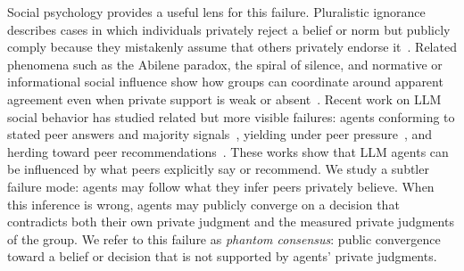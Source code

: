\documentclass{article}
\begin{document}
Social psychology provides a useful lens for this failure. Pluralistic ignorance describes cases in which individuals privately reject a belief or norm but publicly comply because they mistakenly assume that others privately endorse it~\citep{prentice1993pluralistic,miller2023century}. Related phenomena such as the Abilene paradox, the spiral of silence, and normative or informational social influence show how groups can coordinate around apparent agreement even when private support is weak or absent~\citep{harveyabilene1974,noelleneumann1974spiral,deutsch1955normative}. Recent work on LLM social behavior has studied related but more visible failures: agents conforming to stated peer answers and majority signals~\citep{weng2025benchform,zhu2024conformityllm,choi2025groupconformity}, yielding under peer pressure~\citep{song2025kairos}, and herding toward peer recommendations~\citep{tao2025herdbehavior,shi2025opinionchange}. These works show that LLM agents can be influenced by what peers explicitly say or recommend. We study a subtler failure mode: agents may follow what they infer peers privately believe. When this inference is wrong, agents may publicly converge on a decision that contradicts both their own private judgment and the measured private judgments of the group. We refer to this failure as \textit{phantom consensus}: public convergence toward a belief or decision that is not supported by agents' private judgments.
\end{document}
